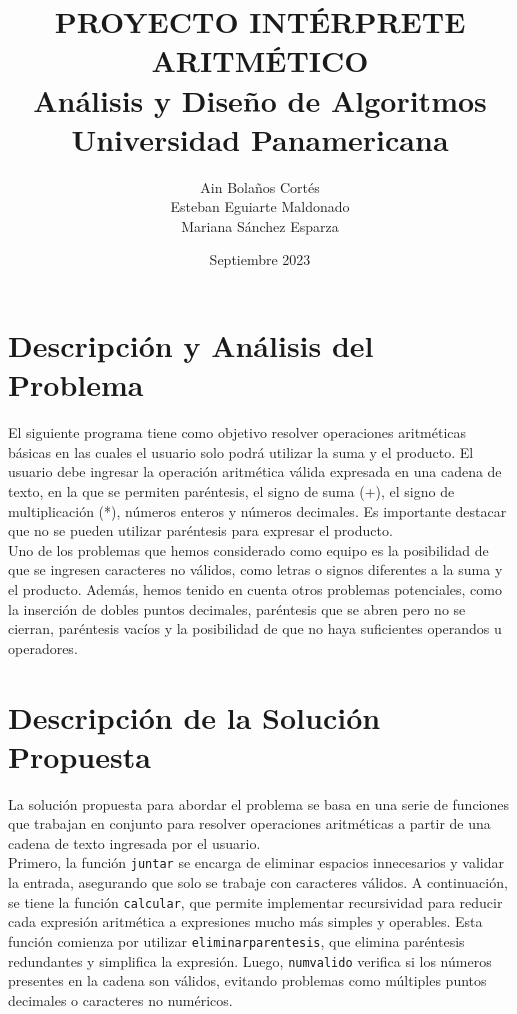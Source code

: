 \documentclass{article}
\title{PROYECTO INTÉRPRETE ARITMÉTICO \\ Análisis y Diseño de Algoritmos \\ Universidad Panamericana}
\author{Ain Bolaños Cortés\\Esteban Eguiarte Maldonado\\Mariana Sánchez Esparza}
\date{Septiembre 2023}
\begin{document}
\maketitle

\section{Descripción y Análisis del Problema}
El siguiente programa tiene como objetivo resolver operaciones aritméticas básicas en las cuales el usuario solo podrá utilizar la suma y el producto. El usuario debe ingresar la operación aritmética válida expresada en una cadena de texto, en la que se permiten paréntesis, el signo de suma (+), el signo de multiplicación (*), números enteros y números decimales. Es importante destacar que no se pueden utilizar paréntesis para expresar el producto.\\

Uno de los problemas que hemos considerado como equipo es la posibilidad de que se ingresen caracteres no válidos, como letras o signos diferentes a la suma y el producto. Además, hemos tenido en cuenta otros problemas potenciales, como la inserción de dobles puntos decimales, paréntesis que se abren pero no se cierran, paréntesis vacíos y la posibilidad de que no haya suficientes operandos u operadores.\\


\section{Descripción de la Solución Propuesta}
La solución propuesta para abordar el problema se basa en una serie de funciones que trabajan en conjunto para resolver operaciones aritméticas a partir de una cadena de texto ingresada por el usuario.\\

Primero, la función \texttt{juntar} se encarga de eliminar espacios innecesarios y validar la entrada, asegurando que solo se trabaje con caracteres válidos. A continuación, se tiene la función \texttt{calcular}, que permite implementar recursividad para reducir cada expresión aritmética a expresiones mucho más simples y operables. Esta función comienza por utilizar \texttt{eliminar\textunderscore parentesis}, que elimina paréntesis redundantes y simplifica la expresión. Luego, \texttt{num\textunderscore valido} verifica si los números presentes en la cadena son válidos, evitando problemas como múltiples puntos decimales o caracteres no numéricos.\\
\end{document}
